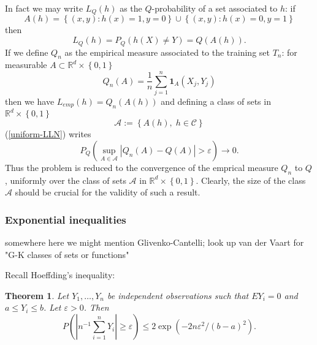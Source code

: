 \documentclass[11pt,twoside]{article}%
\theoremstyle{change}
\newtheorem{theorem}{Theorem}[section]
\newenvironment{quote-env}{\begin{quote}\sffamily }{\end{quote}}
\newenvironment{mycomments-env}[1][Mycomments]{\textbf{#1.} \begin{quote-env} }{ \end{quote-env}  \ \rule{0.5em}{0.5em}}
\begin{document}
In fact we may write $L_{Q}(h)$ as the $Q$-probability of a set associated to
$h$: if
\[
A(h)=\left\{  \left(  x,y\right)  :h(x)=1,y=0\right\}  \cup\left\{  \left(
x,y\right)  :h(x)=0,y=1\right\}
\]
then
\[
L_{Q}(h)=P_{Q}\left(  h(X)\neq Y\right)  =Q\left(  A(h)\right)  .
\]
If we define $Q_{n}$ as the empirical measure associated to the training set
$T_{n}$: for measurable $A\subset\mathbb{R}^{d}\times\left\{  0,1\right\}  $
\[
Q_{n}(A)=\frac{1}{n}\sum_{j=1}^{n}\mathbf{1}_{A}(X_{j},Y_{j})
\]
then we have $L_{emp}(h)=Q_{n}(A(h))$ and defining a class of sets in
$\mathbb{R}^{d}\times\left\{  0,1\right\}  $%
\begin{equation}
\mathcal{A}:=\left\{  A(h),\;h\in\mathcal{C}\right\}
\label{corresp-sets-classif}%
\end{equation}
(\ref{uniform-LLN}) writes
\[
P_{Q}\left(  \sup_{A\in\mathcal{A}}\left\vert Q_{n}(A)-Q\left(  A\right)
\right\vert >\varepsilon\right)  \rightarrow0.
\]
Thus the problem is reduced to the convergence of the emprical measure $Q_{n}
$ to $Q$, uniformly over the class of sets $\mathcal{A}$ in $\mathbb{R}%
^{d}\times\left\{  0,1\right\}  $. Clearly, the size of the class $\mathcal{A}
$ should be crucial for the validity of such a result.

\subsubsection{Exponential inequalities}%

\begin{mycomments}%


\begin{mycomments-env}
somewhere here we might mention Glivenko-Cantelli; look up van der Vaart for
"G-K classes of sets or functions"
\end{mycomments-env}%

\end{mycomments}%
Recall Hoeffding's inequality:

\begin{theorem}
Let $Y_{1},\ldots,Y_{n}$ be independent observations such that $EY_{i}=0$ and
$a\leq Y_{i}\leq b$. Let $\varepsilon>0$. Then
\begin{equation}
P\left(  \left\vert n^{-1}\sum_{i=1}^{n}Y_{i}\right\vert \geq\varepsilon
\right)  \leq2\exp\left(  -2n\varepsilon^{2}/(b-a)^{2}\right)  .\label{Hoeffd}%
\end{equation}

\end{theorem}
\end{document}

